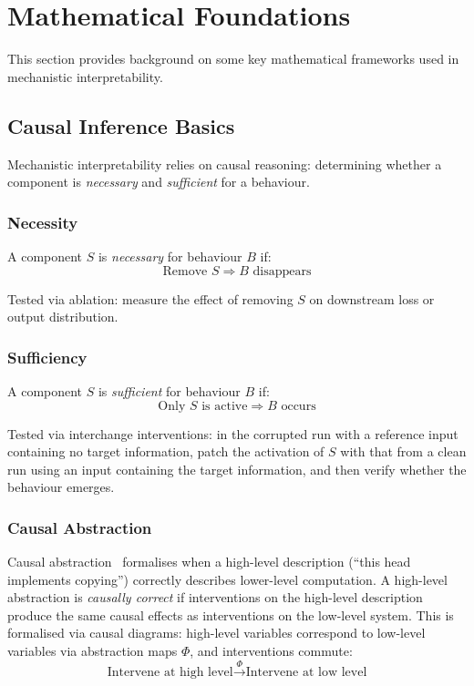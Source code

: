 \section{Mathematical Foundations}
\label{app:math}

This section provides background on some key mathematical frameworks used in mechanistic interpretability.

\subsection{Causal Inference Basics}

Mechanistic interpretability relies on causal reasoning: determining whether a component is \textit{necessary} and \textit{sufficient} for a behaviour.

\subsubsection{Necessity}

A component $S$ is \emph{necessary} for behaviour $B$ if:
\begin{equation}
\text{Remove } S \Rightarrow B \text{ disappears}
\end{equation}

Tested via ablation: measure the effect of removing $S$ on downstream loss or output distribution.

\subsubsection{Sufficiency}

A component $S$ is \emph{sufficient} for behaviour $B$ if:
\begin{equation}
\text{Only } S \text{ is active} \Rightarrow B \text{ occurs}
\end{equation}

Tested via interchange interventions: in the corrupted run with a reference input containing no target information, patch the activation of $S$ with that from a clean run using an input containing the target information, and then verify whether the behaviour emerges.

\subsubsection{Causal Abstraction}

Causal abstraction~ formalises when a high-level description (``this head implements copying'') correctly describes lower-level computation. A high-level abstraction is \emph{causally correct} if interventions on the high-level description produce the same causal effects as interventions on the low-level system. This is formalised via causal diagrams: high-level variables correspond to low-level variables via abstraction maps $\Phi$, and interventions commute:
\begin{equation}
\text{Intervene at high level} \xrightarrow{\Phi} \text{Intervene at low level}
\end{equation}

